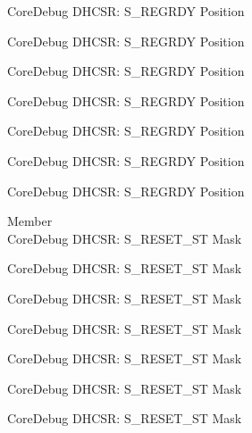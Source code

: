 \begin{DoxyRefList}
\label{deprecated__deprecated000778}%
%
Core\+Debug DHCSR\+: S\+\_\+\+REGRDY Position 

\label{deprecated__deprecated000832}%
%
Core\+Debug DHCSR\+: S\+\_\+\+REGRDY Position 

\label{deprecated__deprecated000917}%
%
Core\+Debug DHCSR\+: S\+\_\+\+REGRDY Position 

\label{deprecated__deprecated000974}%
%
Core\+Debug DHCSR\+: S\+\_\+\+REGRDY Position 

\label{deprecated__deprecated001050}%
%
Core\+Debug DHCSR\+: S\+\_\+\+REGRDY Position 

\label{deprecated__deprecated001137}%
%
Core\+Debug DHCSR\+: S\+\_\+\+REGRDY Position 

\label{deprecated__deprecated001239}%
%
Core\+Debug DHCSR\+: S\+\_\+\+REGRDY Position  
\item[Member \doxylink{group___c_m_s_i_s___core_debug_gac474394bcceb31a8e09566c90b3f8922}{Core\+Debug\+\_\+\+DHCSR\+\_\+\+S\+\_\+\+RESET\+\_\+\+ST\+\_\+\+Msk} ]\hfill \\
\label{deprecated__deprecated000010}%
%
Core\+Debug DHCSR\+: S\+\_\+\+RESET\+\_\+\+ST Mask 

\label{deprecated__deprecated000110}%
%
Core\+Debug DHCSR\+: S\+\_\+\+RESET\+\_\+\+ST Mask 

\label{deprecated__deprecated000164}%
%
Core\+Debug DHCSR\+: S\+\_\+\+RESET\+\_\+\+ST Mask 

\label{deprecated__deprecated000249}%
%
Core\+Debug DHCSR\+: S\+\_\+\+RESET\+\_\+\+ST Mask 

\label{deprecated__deprecated000306}%
%
Core\+Debug DHCSR\+: S\+\_\+\+RESET\+\_\+\+ST Mask 

\label{deprecated__deprecated000382}%
%
Core\+Debug DHCSR\+: S\+\_\+\+RESET\+\_\+\+ST Mask 

\label{deprecated__deprecated000461}%
%
Core\+Debug DHCSR\+: S\+\_\+\+RESET\+\_\+\+ST Mask 


\end{DoxyRefList}

